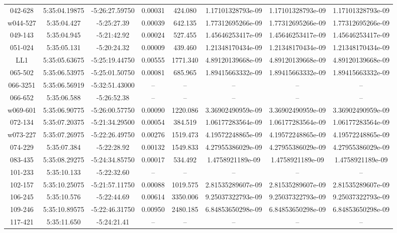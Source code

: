 \begin{table}
\begin{tabular}{cccccccc}
042-628 & 5:35:04.19875 & -5:26:27.59750 & 0.00031 & 424.080 & 1.17101328793e-09 & 1.17101328793e-09 & 1.17101328793e-09 \\
w044-527 & 5:35:04.427 & -5:25:27.39 & 0.00039 & 642.135 & 1.77312695266e-09 & 1.77312695266e-09 & 1.77312695266e-09 \\
049-143 & 5:35:04.945 & -5:21:42.92 & 0.00024 & 527.455 & 1.45646253417e-09 & 1.45646253417e-09 & 1.45646253417e-09 \\
051-024 & 5:35:05.131 & -5:20:24.32 & 0.00009 & 439.460 & 1.21348170434e-09 & 1.21348170434e-09 & 1.21348170434e-09 \\
LL1 & 5:35:05.63675 & -5:25:19.44750 & 0.00555 & 1771.340 & 4.89120139668e-09 & 4.89120139668e-09 & 4.89120139668e-09 \\
065-502 & 5:35:06.53975 & -5:25:01.50750 & 0.00081 & 685.965 & 1.89415663332e-09 & 1.89415663332e-09 & 1.89415663332e-09 \\
066-3251 & 5:35:06.56919 & -5:32:51.43000 & -- & -- & -- & -- & -- \\
066-652 & 5:35:06.588 & -5:26:52.38 & -- & -- & -- & -- & -- \\
w069-601 & 5:35:06.90775 & -5:26:00.57750 & 0.00090 & 1220.086 & 3.36902490959e-09 & 3.36902490959e-09 & 3.36902490959e-09 \\
072-134 & 5:35:07.20375 & -5:21:34.29500 & 0.00054 & 384.519 & 1.06177283564e-09 & 1.06177283564e-09 & 1.06177283564e-09 \\
w073-227 & 5:35:07.26975 & -5:22:26.49750 & 0.00276 & 1519.473 & 4.19572248865e-09 & 4.19572248865e-09 & 4.19572248865e-09 \\
074-229 & 5:35:07.384 & -5:22:28.92 & 0.00132 & 1549.833 & 4.27955386029e-09 & 4.27955386029e-09 & 4.27955386029e-09 \\
083-435 & 5:35:08.29275 & -5:24:34.85750 & 0.00017 & 534.492 & 1.4758921189e-09 & 1.4758921189e-09 & 1.4758921189e-09 \\
101-233 & 5:35:10.133 & -5:22:32.60 & -- & -- & -- & -- & -- \\
102-157 & 5:35:10.25075 & -5:21:57.11750 & 0.00088 & 1019.575 & 2.81535289607e-09 & 2.81535289607e-09 & 2.81535289607e-09 \\
106-245 & 5:35:10.576 & -5:22:44.69 & 0.00614 & 3350.006 & 9.25037322793e-09 & 9.25037322793e-09 & 9.25037322793e-09 \\
109-246 & 5:35:10.89575 & -5:22:46.31750 & 0.00950 & 2480.185 & 6.84853650298e-09 & 6.84853650298e-09 & 6.84853650298e-09 \\
117-421 & 5:35:11.650 & -5:24:21.41 & -- & -- & -- & -- & -- \\

\end{tabular}
\end{table}
